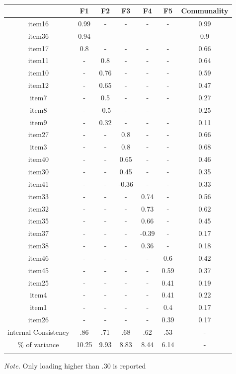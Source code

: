 \documentclass[
  english,
  man]{apa6}
\begin{document}
\begin{table}[tbp]

\begin{center}
\begin{threeparttable}

\caption{\label{tab:TabEFA5}}

\begin{tabular}{ccccccc}
\toprule
 & \multicolumn{1}{c}{F1} & \multicolumn{1}{c}{F2} & \multicolumn{1}{c}{F3} & \multicolumn{1}{c}{F4} & \multicolumn{1}{c}{F5} & \multicolumn{1}{c}{Communality}\\
\midrule
item16 & 0.99 & - & - & - & - & 0.99\\
item36 & 0.94 & - & - & - & - & 0.9\\
item17 & 0.8 & - & - & - & - & 0.66\\
item11 & - & 0.8 & - & - & - & 0.64\\
item10 & - & 0.76 & - & - & - & 0.59\\
item12 & - & 0.65 & - & - & - & 0.47\\
item7 & - & 0.5 & - & - & - & 0.27\\
item8 & - & -0.5 & - & - & - & 0.25\\
item9 & - & 0.32 & - & - & - & 0.11\\
item27 & - & - & 0.8 & - & - & 0.66\\
item3 & - & - & 0.8 & - & - & 0.68\\
item40 & - & - & 0.65 & - & - & 0.46\\
item30 & - & - & 0.45 & - & - & 0.35\\
item41 & - & - & -0.36 & - & - & 0.33\\
item33 & - & - & - & 0.74 & - & 0.56\\
item32 & - & - & - & 0.73 & - & 0.62\\
item35 & - & - & - & 0.66 & - & 0.45\\
item37 & - & - & - & -0.39 & - & 0.17\\
item38 & - & - & - & 0.36 & - & 0.18\\
item46 & - & - & - & - & 0.6 & 0.42\\
item45 & - & - & - & - & 0.59 & 0.37\\
item25 & - & - & - & - & 0.41 & 0.19\\
item4 & - & - & - & - & 0.41 & 0.22\\
item1 & - & - & - & - & 0.4 & 0.17\\
item26 & - & - & - & - & 0.39 & 0.17\\
internal Consistency & .86 & .71 & .68 & .62 & .53 & -\\
\% of variance & 10.25 & 9.93 & 8.83 & 8.44 & 6.14 & -\\
\bottomrule
\addlinespace
\end{tabular}

\begin{tablenotes}[para]
\normalsize{\textit{Note.} Only loading higher than .30 is reported}
\end{tablenotes}

\end{threeparttable}
\end{center}

\end{table}
\end{document}
